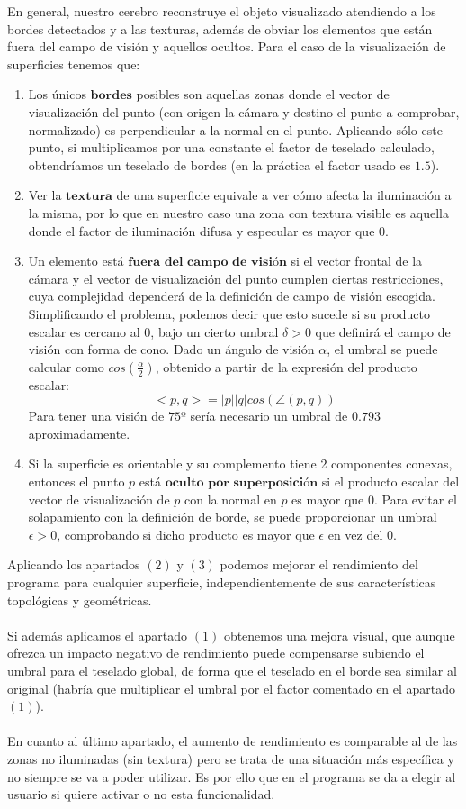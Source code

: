 	En general, nuestro cerebro reconstruye el objeto visualizado atendiendo a los bordes detectados y a las texturas, además de obviar los elementos que están fuera del campo de visión y aquellos ocultos. Para el caso de la visualización de superficies tenemos que:
	\begin{enumerate}
		\item Los únicos $\textbf{bordes}$ posibles son aquellas zonas donde el vector de visualización del punto (con origen la cámara y destino el punto a comprobar, normalizado) es perpendicular a la normal en el punto. Aplicando sólo este punto, si multiplicamos por una constante el factor de teselado calculado, obtendríamos un teselado de bordes (en la práctica el factor usado es $1.5$).
		\item Ver la $\textbf{textura}$ de una superficie equivale a ver cómo afecta la iluminación a la misma, por lo que en nuestro caso una zona con textura visible es aquella donde el factor de iluminación difusa y especular es mayor que $0$.
		\item Un elemento está $\textbf{fuera del campo de visión}$ si el vector frontal de la cámara y el vector de visualización del punto cumplen ciertas restricciones, cuya complejidad dependerá de la definición de campo de visión escogida. Simplificando el problema, podemos decir que esto sucede si su producto escalar es cercano al $0$, bajo un cierto umbral $\delta>0$ que definirá el campo de visión con forma de cono. Dado un ángulo de visión $\alpha$, el umbral se puede calcular como $cos(\frac{\alpha}{2})$, obtenido a partir de la expresión del producto escalar:
		$$<p,q>=|p||q|cos(\angle(p,q))$$
		Para tener una visión de $75$º sería necesario un umbral de $0.793$ aproximadamente.
		\item Si la superficie es orientable y su complemento tiene 2 componentes conexas, entonces el punto $p$ está $\textbf{oculto por superposición}$ si el producto escalar del vector de visualización de $p$ con la normal en $p$ es mayor que $0$. Para evitar el solapamiento con la definición de borde, se puede proporcionar un umbral $\epsilon>0$, comprobando si dicho producto es mayor que $\epsilon$ en vez del $0$.
	\end{enumerate}
	
	Aplicando los apartados $(2)$ y $(3)$ podemos mejorar el rendimiento del programa para cualquier superficie, independientemente de sus características topológicas y geométricas.\\
	\\Si además aplicamos el apartado $(1)$ obtenemos una mejora visual, que aunque ofrezca un impacto negativo de rendimiento puede compensarse subiendo el umbral para el teselado global, de forma que el teselado en el borde sea similar al original (habría que multiplicar el umbral por el factor comentado en el apartado $(1)$).\\
	\\En cuanto al último apartado, el aumento de rendimiento es comparable al de las zonas no iluminadas (sin textura) pero se trata de una situación más específica y no siempre se va a poder utilizar. Es por ello que en el programa se da a elegir al usuario si quiere activar o no esta funcionalidad.
	

\endinput
